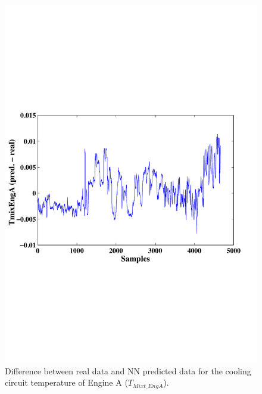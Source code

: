 \begin{figure}
\centering
\includegraphics[width=1\textwidth]{figures/TmixEngAdiff.pdf}
\caption{Difference between real data and NN predicted data for the cooling circuit temperature of Engine A ($T_{Mixt\_EngA}$).}
\label{TcoolA}
\end{figure}

